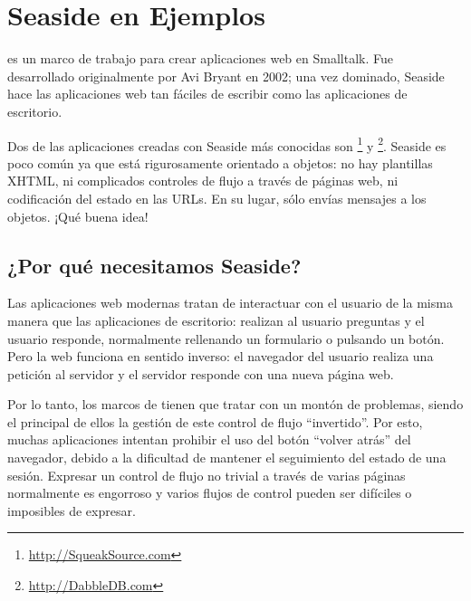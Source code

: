 \documentclass[a4paper,10pt,twoside]{book}
\begin{document}
	\sloppy
\fi
\chapter{Seaside en Ejemplos}



 es un marco de trabajo para crear aplicaciones web en Smalltalk. Fue desarrollado originalmente por Avi Bryant  en 2002; una vez dominado, Seaside hace las aplicaciones web tan fáciles de escribir como las aplicaciones de escritorio.

Dos de las aplicaciones creadas con Seaside más conocidas son \footnote{\url{http://SqueakSource.com}} y \footnote{\url{http://DabbleDB.com}}.
Seaside es poco común ya que está rigurosamente orientado a objetos: no hay plantillas XHTML, ni complicados controles de flujo a través de páginas web, ni codificación del estado en las URLs. En su lugar, sólo envías mensajes a los objetos. ¡Qué buena idea!

\section{¿Por qué necesitamos Seaside?}

Las aplicaciones web modernas tratan de interactuar con el usuario de la misma manera que las aplicaciones de escritorio: realizan al usuario preguntas y el usuario responde, normalmente rellenando un formulario o pulsando un botón. Pero la web funciona en sentido inverso: el navegador del usuario realiza una petición al servidor y el servidor responde con una nueva página web.

Por lo tanto, los marcos de  tienen que tratar con un montón de problemas, siendo el principal de ellos la gestión de este control de flujo ``invertido''.
Por esto, muchas aplicaciones intentan prohibir el uso del botón ``volver atrás'' del navegador, debido a la dificultad de mantener el seguimiento del estado de una sesión.
Expresar un control de flujo no trivial a través de varias páginas normalmente es engorroso y varios flujos de control pueden ser difíciles o imposibles de expresar.
\end{document}
